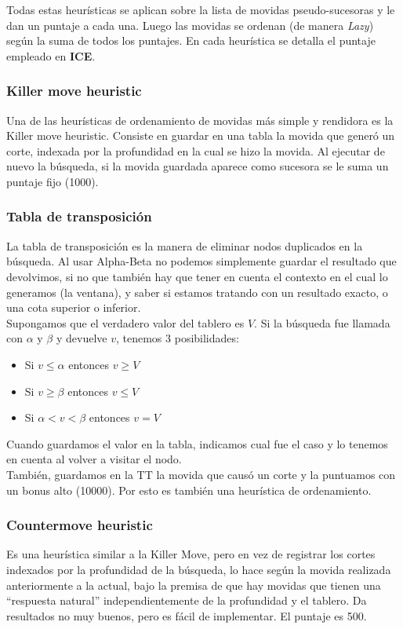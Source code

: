\documentclass{article}
\newcommand{\ICE}[0]{{\bf ICE}}
\begin{document}
\begin{multicols}{2}
Todas estas heurísticas se aplican sobre la lista de movidas
pseudo-sucesoras y le dan un puntaje a cada una. Luego las movidas se
ordenan (de manera \emph{Lazy}) según la suma de todos los puntajes. En
cada heurística se detalla el puntaje empleado en \ICE{}.

\subsubsection{Killer move heuristic}
Una de las heurísticas de ordenamiento de movidas más simple y
rendidora es la Killer move heuristic. Consiste en guardar en una tabla
la movida que generó un corte, indexada por la profundidad en la cual
se hizo la movida. Al ejecutar de nuevo la búsqueda, si la movida
guardada aparece como sucesora se le suma un puntaje fijo (1000).
\\

\subsubsection{Tabla de transposición}
La tabla de transposición es la manera de eliminar nodos duplicados
en la búsqueda. Al usar Alpha-Beta no podemos simplemente guardar el
resultado que devolvimos, si no que también hay que tener en cuenta
el contexto en el cual lo generamos (la ventana), y saber si estamos
tratando con un resultado exacto, o una cota superior o inferior.
\\

Supongamos que el verdadero valor del tablero es $V$. Si la búsqueda
fue llamada con $\alpha$ y $\beta$ y devuelve $v$, tenemos 3
posibilidades:

\begin{itemize}
\item Si $v \le \alpha$ entonces $v \ge V$
\item Si $v \ge \beta$ entonces $v \le V$
\item Si $\alpha < v < \beta$ entonces $v = V$
\end{itemize}

Cuando guardamos el valor en la tabla, indicamos cual fue el caso y lo
tenemos en cuenta al volver a visitar el nodo.
\\

También, guardamos en la TT la movida que causó un corte y la
puntuamos con un bonus alto (10000). Por esto es también una
heurística de ordenamiento.

\subsubsection{Countermove heuristic}
Es una heurística similar a la Killer Move, pero en vez de registrar
los cortes indexados por la profundidad de la búsqueda, lo hace según
la movida realizada anteriormente a la actual, bajo la premisa de que
hay movidas que tienen una ``respuesta natural'' independientemente de
la profundidad y el tablero. Da resultados no muy buenos, pero es fácil
de implementar. El puntaje es 500.


\end{multicols}
\end{document}
